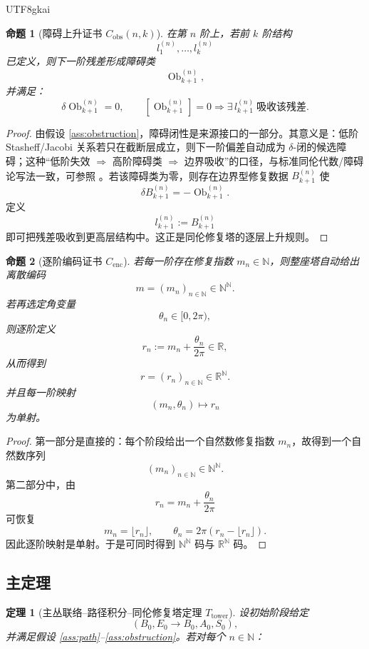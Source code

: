 \documentclass[12pt]{article}
\newtheorem{theorem}{定理}[section]
\newtheorem{proposition}{命题}[section]
\newcommand{\Ob}{\operatorname{Ob}}
\newcommand{\NN}{\mathbb{N}}
\newcommand{\RR}{\mathbb{R}}
\begin{document}
\begin{CJK*}{UTF8}{gkai}
\begin{proposition}[障碍上升证书 $C_{\mathrm{obs}}(n,k)$]\label{prop:obs}
在第 $n$ 阶上，若前 $k$ 阶结构
\[
l_1^{(n)},\dots,l_k^{(n)}
\]
已定义，则下一阶残差形成障碍类
\[
\Ob_{k+1}^{(n)},
\]
并满足：
\[
\delta\Ob_{k+1}^{(n)}=0,
\qquad
[\Ob_{k+1}^{(n)}]=0\Longrightarrow \exists\, l_{k+1}^{(n)}\ \text{吸收该残差}.
\]
\end{proposition}

\begin{proof}
由假设 \ref{ass:obstruction}，障碍闭性是来源接口的一部分。其意义是：低阶 Stasheff/Jacobi 关系若只在截断层成立，则下一阶偏差自动成为 $\delta$-闭的候选障碍；这种“低阶失效
  $\Rightarrow$ 高阶障碍类 $\Rightarrow$ 边界吸收”的口径，与标准同伦代数/障碍论写法一致，可参照 \cite{Whitehead1978Elements,
  Weibel1994HomologicalAlgebra,LodayVallette2012AlgebraicOperads}。若该障碍类为零，则存在边界型修复数据 $B_{k+1}^{(n)}$ 使
\[
\delta B_{k+1}^{(n)}=-\Ob_{k+1}^{(n)}.
\]
定义
\[
l_{k+1}^{(n)}:=B_{k+1}^{(n)}
\]
即可把残差吸收到更高层结构中。这正是同伦修复塔的逐层上升规则。
\end{proof}

\begin{proposition}[逐阶编码证书 $C_{\mathrm{enc}}$]\label{prop:encn}
若每一阶存在修复指数 $m_n\in\NN$，则整座塔自动给出离散编码
\[
m=(m_n)_{n\in\NN}\in\NN^\NN.
\]
若再选定角变量
\[
\theta_n\in[0,2\pi),
\]
则逐阶定义
\[
r_n:=m_n+\frac{\theta_n}{2\pi}\in\RR,
\]
从而得到
\[
r=(r_n)_{n\in\NN}\in\RR^\NN.
\]
并且每一阶映射
\[
(m_n,\theta_n)\mapsto r_n
\]
为单射。
\end{proposition}

\begin{proof}
第一部分是直接的：每个阶段给出一个自然数修复指数 $m_n$，故得到一个自然数序列
\[
(m_n)_{n\in\NN}\in\NN^\NN.
\]
第二部分中，由
\[
r_n=m_n+\frac{\theta_n}{2\pi}
\]
可恢复
\[
m_n=\lfloor r_n\rfloor,
\qquad
\theta_n=2\pi(r_n-\lfloor r_n\rfloor).
\]
因此逐阶映射是单射。于是可同时得到 $\NN^\NN$ 码与 $\RR^\NN$ 码。
\end{proof}

\subsection{主定理}

\begin{theorem}[主丛联络--路径积分--同伦修复塔定理 $T_{\mathrm{tower}}$]\label{thm:tower}
设初始阶段给定
\[
(B_0,E_0\to B_0,A_0,S_0),
\]
并满足假设 \ref{ass:path}--\ref{ass:obstruction}。若对每个 $n\in\NN$：


\end{theorem}
\end{CJK*}
\end{document}

